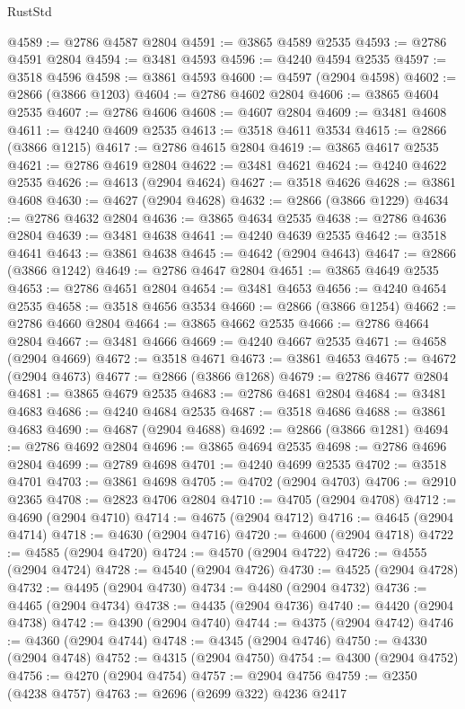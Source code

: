 \begin{lexlean}{RustStd}
\begin{coremodule}
@4589 := @2786 @4587 @2804
@4591 := @3865 @4589 @2535
@4593 := @2786 @4591 @2804
@4594 := @3481 @4593
@4596 := @4240 @4594 @2535
@4597 := @3518 @4596
@4598 := @3861 @4593
@4600 := @4597 (@2904 @4598)
@4602 := @2866 (@3866 @1203)
@4604 := @2786 @4602 @2804
@4606 := @3865 @4604 @2535
@4607 := @2786 @4606
@4608 := @4607 @2804
@4609 := @3481 @4608
@4611 := @4240 @4609 @2535
@4613 := @3518 @4611 @3534
@4615 := @2866 (@3866 @1215)
@4617 := @2786 @4615 @2804
@4619 := @3865 @4617 @2535
@4621 := @2786 @4619 @2804
@4622 := @3481 @4621
@4624 := @4240 @4622 @2535
@4626 := @4613 (@2904 @4624)
@4627 := @3518 @4626
@4628 := @3861 @4608
@4630 := @4627 (@2904 @4628)
@4632 := @2866 (@3866 @1229)
@4634 := @2786 @4632 @2804
@4636 := @3865 @4634 @2535
@4638 := @2786 @4636 @2804
@4639 := @3481 @4638
@4641 := @4240 @4639 @2535
@4642 := @3518 @4641
@4643 := @3861 @4638
@4645 := @4642 (@2904 @4643)
@4647 := @2866 (@3866 @1242)
@4649 := @2786 @4647 @2804
@4651 := @3865 @4649 @2535
@4653 := @2786 @4651 @2804
@4654 := @3481 @4653
@4656 := @4240 @4654 @2535
@4658 := @3518 @4656 @3534
@4660 := @2866 (@3866 @1254)
@4662 := @2786 @4660 @2804
@4664 := @3865 @4662 @2535
@4666 := @2786 @4664 @2804
@4667 := @3481 @4666
@4669 := @4240 @4667 @2535
@4671 := @4658 (@2904 @4669)
@4672 := @3518 @4671
@4673 := @3861 @4653
@4675 := @4672 (@2904 @4673)
@4677 := @2866 (@3866 @1268)
@4679 := @2786 @4677 @2804
@4681 := @3865 @4679 @2535
@4683 := @2786 @4681 @2804
@4684 := @3481 @4683
@4686 := @4240 @4684 @2535
@4687 := @3518 @4686
@4688 := @3861 @4683
@4690 := @4687 (@2904 @4688)
@4692 := @2866 (@3866 @1281)
@4694 := @2786 @4692 @2804
@4696 := @3865 @4694 @2535
@4698 := @2786 @4696 @2804
@4699 := @2789 @4698
@4701 := @4240 @4699 @2535
@4702 := @3518 @4701
@4703 := @3861 @4698
@4705 := @4702 (@2904 @4703)
@4706 := @2910 @2365
@4708 := @2823 @4706 @2804
@4710 := @4705 (@2904 @4708)
@4712 := @4690 (@2904 @4710)
@4714 := @4675 (@2904 @4712)
@4716 := @4645 (@2904 @4714)
@4718 := @4630 (@2904 @4716)
@4720 := @4600 (@2904 @4718)
@4722 := @4585 (@2904 @4720)
@4724 := @4570 (@2904 @4722)
@4726 := @4555 (@2904 @4724)
@4728 := @4540 (@2904 @4726)
@4730 := @4525 (@2904 @4728)
@4732 := @4495 (@2904 @4730)
@4734 := @4480 (@2904 @4732)
@4736 := @4465 (@2904 @4734)
@4738 := @4435 (@2904 @4736)
@4740 := @4420 (@2904 @4738)
@4742 := @4390 (@2904 @4740)
@4744 := @4375 (@2904 @4742)
@4746 := @4360 (@2904 @4744)
@4748 := @4345 (@2904 @4746)
@4750 := @4330 (@2904 @4748)
@4752 := @4315 (@2904 @4750)
@4754 := @4300 (@2904 @4752)
@4756 := @4270 (@2904 @4754)
@4757 := @2904 @4756
@4759 := @2350 (@4238 @4757)
@4763 := @2696 (@2699 @322) @4236 @2417

\end{coremodule}
\end{lexlean}
